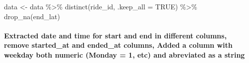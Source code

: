 \documentclass[
]{article}
\newenvironment{Shaded}{\begin{snugshade}}{\end{snugshade}}
\newcommand{\AttributeTok}[1]{\textcolor[rgb]{0.77,0.63,0.00}{#1}}
\newcommand{\ConstantTok}[1]{\textcolor[rgb]{0.00,0.00,0.00}{#1}}
\newcommand{\FunctionTok}[1]{\textcolor[rgb]{0.00,0.00,0.00}{#1}}
\newcommand{\NormalTok}[1]{#1}
\newcommand{\OtherTok}[1]{\textcolor[rgb]{0.56,0.35,0.01}{#1}}
\newcommand{\SpecialCharTok}[1]{\textcolor[rgb]{0.00,0.00,0.00}{#1}}
\begin{document}
\begin{Shaded}
\begin{Highlighting}[]
\NormalTok{data }\OtherTok{\textless{}{-}}\NormalTok{ data }\SpecialCharTok{\%\textgreater{}\%}
  \FunctionTok{distinct}\NormalTok{(ride\_id, }\AttributeTok{.keep\_all =} \ConstantTok{TRUE}\NormalTok{) }\SpecialCharTok{\%\textgreater{}\%}                       
  \FunctionTok{drop\_na}\NormalTok{(end\_lat)        }
\end{Highlighting}
\end{Shaded}

\hypertarget{extracted-date-and-time-for-start-and-end-in-different-columns-remove-started_at-and-ended_at-columns-added-a-column-with-weekday-both-numeric-monday-1-etc-and-abreviated-as-a-string}{%
\paragraph{Extracted date and time for start and end in different
columns, remove started\_at and ended\_at columns, Added a column with
weekday both numeric (Monday = 1, etc) and abreviated as a
string}\label{extracted-date-and-time-for-start-and-end-in-different-columns-remove-started_at-and-ended_at-columns-added-a-column-with-weekday-both-numeric-monday-1-etc-and-abreviated-as-a-string}}
\end{document}
